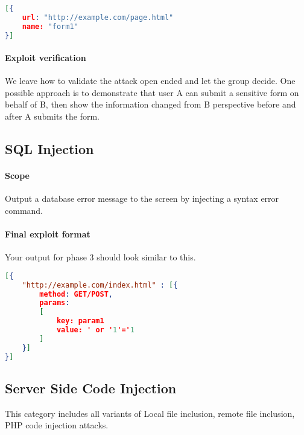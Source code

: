 \documentclass{article}[10pt]
\begin{document}
\begin{lstlisting}[language=json,firstnumber=1]
[{
	url: "http://example.com/page.html"
	name: "form1"
}]
\end{lstlisting}

\paragraph{Exploit verification} We leave how to validate the attack open ended and let the group decide. One possible approach is to demonstrate that user A can submit a sensitive form on behalf of B, then show the information changed from B perspective before and after A submits the form.

\subsection{SQL Injection}
\paragraph{Scope} Output a database error message to the screen by injecting a syntax error command.

\paragraph{Final exploit format} Your output for phase 3 should look similar to this.

\begin{lstlisting}[language=json,firstnumber=1]
[{
	"http://example.com/index.html" : [{
		method: GET/POST,
		params: 
		[
			key: param1
			value: ' or '1'='1
		]
	}]
}]
\end{lstlisting}

\subsection{Server Side Code Injection}
This category includes all variants of Local file inclusion, remote file inclusion, PHP code injection attacks.
\end{document}
